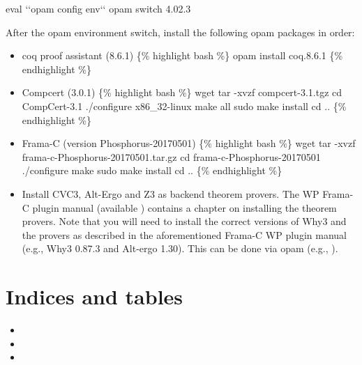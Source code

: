 \documentclass[letterpaper,10pt,english]{sphinxmanual}
\begin{document}
\begin{sphinxVerbatim}[commandchars=\\\{\}]
eval {}`{}`opam config env{}`{}`
opam switch 4.02.3
\end{sphinxVerbatim}

After the opam environment switch, install the following opam packages in order:

\begin{sphinxVerbatim}[commandchars=\\\{\}]
  
  
  
  
  
\end{sphinxVerbatim}
\begin{itemize}
\item {} 
coq proof assistant (8.6.1) \{\% highlight bash \%\} opam install
coq.8.6.1 \{\% endhighlight \%\}

\item {} 
Compcert (3.0.1) \{\% highlight bash \%\} wget
 tar -xvzf
compcert-3.1.tgz cd CompCert-3.1 ./configure x86\_32-linux make all
sudo make install cd .. \{\% endhighlight \%\}

\item {} 
Frama-C (version Phosphorus-20170501) \{\% highlight bash \%\} wget
 tar
-xvzf frama-c-Phosphorus-20170501.tar.gz cd
frama-c-Phosphorus-20170501 ./configure make sudo make install cd ..
\{\% endhighlight \%\}

\item {} 
Install CVC3, Alt-Ergo and Z3 as backend theorem provers. The WP
Frama-C plugin manual (available
)
contains a chapter on installing the theorem provers. Note that you
will need to install the correct versions of Why3 and the provers as
described in the aforementioned Frama-C WP plugin manual (e.g., Why3
0.87.3 and Alt-ergo 1.30). This can be done via opam (e.g.,
).

\end{itemize}


\chapter{Indices and tables}
\label{\detokenize{index:indices-and-tables}}\begin{itemize}
\item {} 

\item {} 

\item {} 

\end{itemize}



\renewcommand{\indexname}{Index}
\printindex
\end{document}
